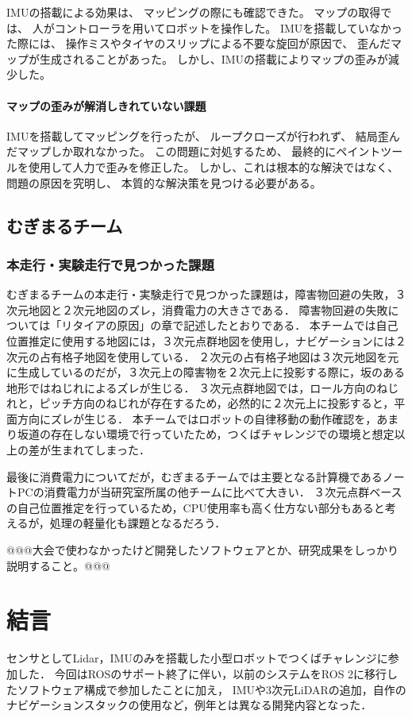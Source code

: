 \documentclass[twocolumn,9pt]{jsproceedings}
\begin{document}
IMUの搭載による効果は、
マッピングの際にも確認できた。
マップの取得では、
人がコントローラを用いてロボットを操作した。
IMUを搭載していなかった際には、
操作ミスやタイヤのスリップによる不要な旋回が原因で、
歪んだマップが生成されることがあった。
しかし、IMUの搭載によりマップの歪みが減少した。


\paragraph{マップの歪みが解消しきれていない課題}


IMUを搭載してマッピングを行ったが、
ループクローズが行われず、
結局歪んだマップしか取れなかった。
この問題に対処するため、
最終的にペイントツールを使用して人力で歪みを修正した。
しかし、これは根本的な解決ではなく、
問題の原因を究明し、
本質的な解決策を見つける必要がある。

\subsection{むぎまるチーム}
\subsubsection{本走行・実験走行で見つかった課題}

むぎまるチームの本走行・実験走行で見つかった課題は，障害物回避の失敗，３次元地図と２次元地図のズレ，消費電力の大きさである．
障害物回避の失敗については「リタイアの原因」の章で記述したとおりである．
本チームでは自己位置推定に使用する地図には，３次元点群地図を使用し，ナビゲーションには２次元の占有格子地図を使用している．
２次元の占有格子地図は３次元地図を元に生成しているのだが，３次元上の障害物を２次元上に投影する際に，坂のある地形ではねじれによるズレが生じる．
３次元点群地図では，ロール方向のねじれと，ピッチ方向のねじれが存在するため，必然的に２次元上に投影すると，平面方向にズレが生じる．
本チームではロボットの自律移動の動作確認を，あまり坂道の存在しない環境で行っていたため，つくばチャレンジでの環境と想定以上の差が生まれてしまった．

最後に消費電力についてだが，むぎまるチームでは主要となる計算機であるノートPCの消費電力が当研究室所属の他チームに比べて大きい．
３次元点群ベースの自己位置推定を行っているため，CPU使用率も高く仕方ない部分もあると考えるが，処理の軽量化も課題となるだろう．

@@@大会で使わなかったけど開発したソフトウェアとか、研究成果をしっかり説明すること。@@@

\section{結言}
センサとしてLidar，IMUのみを搭載した小型ロボットでつくばチャレンジに参加した．
今回はROSのサポート終了に伴い，以前のシステムをROS 2に移行したソフトウェア構成で参加したことに加え，
IMUや3次元LiDARの追加，自作のナビゲーションスタックの使用など，例年とは異なる開発内容となった．
\end{document}
